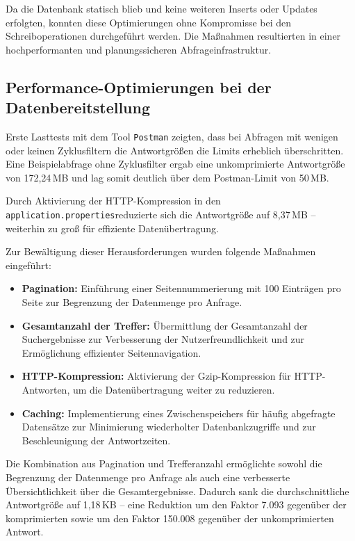 \documentclass[12pt, ngerman, a4paper, numbers=noenddot]{article}
\begin{document}
Da die Datenbank statisch blieb und keine weiteren Inserts oder Updates erfolgten, konnten diese Optimierungen ohne Kompromisse bei den Schreiboperationen durchgeführt werden. Die Maßnahmen resultierten in einer hochperformanten und planungssicheren Abfrageinfrastruktur.


\newpage
\subsection{Performance-Optimierungen bei der Datenbereitstellung}

Erste Lasttests mit dem Tool \lstinline|Postman| zeigten, dass bei Abfragen mit wenigen oder keinen Zyklusfiltern die Antwortgrößen die Limits erheblich überschritten. Eine Beispielabfrage ohne Zyklusfilter ergab eine unkomprimierte Antwortgröße von 172,24\,MB und lag somit deutlich über dem Postman-Limit von 50\,MB.

Durch Aktivierung der HTTP-Kompression in den \lstinline|application.properties|\newline reduzierte sich die Antwortgröße auf 8,37\,MB – weiterhin zu groß für effiziente Datenübertragung.

Zur Bewältigung dieser Herausforderungen wurden folgende Maßnahmen eingeführt:

\begin{itemize}
	\item \textbf{Pagination:} Einführung einer Seitennummerierung mit 100 Einträgen pro Seite zur Begrenzung der Datenmenge pro Anfrage.
	
	\item \textbf{Gesamtanzahl der Treffer:} Übermittlung der Gesamtanzahl der Suchergebnisse zur Verbesserung der Nutzerfreundlichkeit und zur Ermöglichung effizienter Seitennavigation.
	
	\item \textbf{HTTP-Kompression:} Aktivierung der Gzip-Kompression für HTTP\hyp{}Antworten, um die Datenübertragung weiter zu reduzieren.
	
	\item \textbf{Caching:} Implementierung eines Zwischenspeichers für häufig abgefragte Datensätze zur Minimierung wiederholter Datenbankzugriffe und zur Beschleunigung der Antwortzeiten.
\end{itemize}

Die Kombination aus Pagination und Trefferanzahl ermöglichte sowohl die Begrenzung der Datenmenge pro Anfrage als auch eine verbesserte Übersichtlichkeit über die Gesamtergebnisse. Dadurch sank die durchschnittliche Antwortgröße auf 1,18\,KB – eine Reduktion um den Faktor 7.093 gegenüber der komprimierten sowie um den Faktor 150.008 gegenüber der unkomprimierten Antwort.
\end{document}
